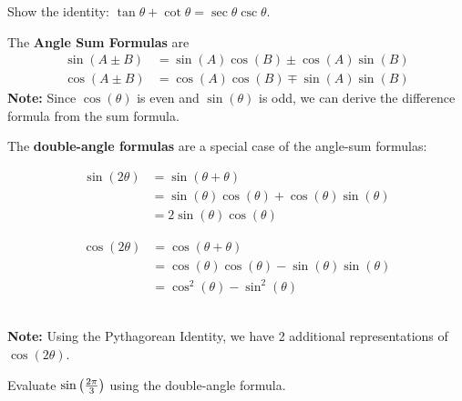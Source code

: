 \documentclass[mathNotesPreamble]{subfiles}
\begin{document}
    \begin{ex*}
      Show the identity: $\tan\theta+\cot\theta=\sec\theta\csc\theta$.
    \end{ex*}
    \pagebreak

    \begin{defn*}
      The \textbf{Angle Sum Formulas} are
      \begin{align*}
        \sin(A\pm B)&=\sin(A)\cos(B)\pm\cos(A)\sin(B)\\
        \cos(A\pm B)&=\cos(A)\cos(B)\mp\sin(A)\sin(B)
      \end{align*}
      \textbf{Note:} Since $\cos(\theta)$ is even and $\sin(\theta)$ is odd, we can derive the difference formula from the sum formula.
    \end{defn*}
    \vspace*{15pt}

    \begin{defn*}
      The \textbf{double-angle formulas} are a special case of the angle-sum formulas:
      \begin{minipage}{0.5\linewidth}
        \begin{align*}
          \sin(2\theta)&=\sin(\theta+\theta)\\
            &=\sin(\theta)\cos(\theta)+\cos(\theta)\sin(\theta)\\
            &=\boxed{2\sin(\theta)\cos(\theta)}
        \end{align*}
      \end{minipage}%
      \begin{minipage}{0.5\linewidth}
        \begin{align*}
          \cos(2\theta)&=\cos(\theta+\theta)\\
            &=\cos(\theta)\cos(\theta)-\sin(\theta)\sin(\theta)\\
            &=\boxed{\cos^2(\theta)-\sin^2(\theta)}
        \end{align*}
      \end{minipage}\\[15pt]

    \textbf{Note:} Using the Pythagorean Identity, we have 2 additional representations of $\cos(2\theta)$.
    \end{defn*}

    \begin{ex*}
      Evaluate $\sin{\left(\frac{2\pi}{3}\right)}$ using the double-angle formula.
    \end{ex*}
    \pagebreak
\end{document}
